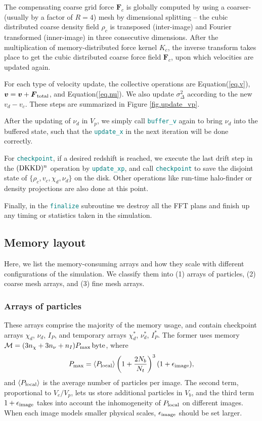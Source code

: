 \documentclass[10pt,twocolumn,reprint]{emulateapj}
\newcommand{\bs}{\boldsymbol}
\newcommand{\tcx}{\textcolor{teal}}
\begin{document}
The compensating coarse grid force ${\bs F}_c$ is globally computed by using a coarser- (usually by a factor of $R=4$) mesh by dimensional splitting -- the cubic distributed coarse density field $\rho_c$ is transposed (inter-image) and Fourier transformed (inner-image) in three consecutive dimensions. After the multiplication of memory-distributed force kernel $K_c$, the inverse transform takes place to get the cubic distributed coarse force field ${\bs F}_c$, upon which velocities are updated again.

For each type of velocity update, the collective operations are Equation(\ref{eq.v}), ${\bs v}={\bs v}+{\bs F}_{\rm total}$, and Equation(\ref{eq.nu}). We also update $\sigma^2_{\Delta}$ according to the new $v_d-v_c$. These steps are summarized in Figure \ref{fig.update_vp}.

After the updating of $\nu_d$ in $V_p$, we simply call {\tt \tcx{buffer\_v}} again to bring $\nu_d$ into the buffered state, such that the {\tt \tcx{update\_x}} in the next iteration will be done correctly.

For {\tt \tcx{checkpoint}},
if a desired redshift is reached, we execute the last drift step in the $({\rm DKKD})^n$ operation by {\tt \tcx{update\_xp}}, and call {\tt \tcx{checkpoint}} to save the disjoint state of $\{\rho_c,v_c,\chi_d,\nu_d\}$ on the disk. Other operations like run-time halo-finder or density projections are also done at this point.

Finally, in the {\tt \tcx{finalize}} subroutine
we destroy all the FFT plans and finish up any timing or statistics taken in the simulation.

\subsection{Memory layout}\label{ss.memory}
Here, we list the memory-consuming arrays and how they scale with different configurations of the simulation. We classify them into (1) arrays of particles, (2) coarse mesh arrays, and (3) fine mesh arrays.

\subsubsection{Arrays of particles}
These arrays comprise the majority of the memory usage, and contain checkpoint arrays $\chi_d$, $\nu_d$, $I_P$, and temporary arrays $\chi_d^*$, $\nu_d^*$, $I_P^*$. The former uses memory $\mathcal{M}=(3n_\chi+3n_\nu+n_I)P_{\rm max}\,{\rm byte}$, where
\begin{equation}\label{eq.npmax}
	P_{\rm max}=\left\langle P_{\rm local} \right\rangle \left( 1+\frac{2N_b}{N_t} \right)^3(1+\epsilon_{\rm image}),
\end{equation}
and $\left\langle P_{\rm local} \right\rangle$ is the average number of particles per image. The second term, proportional to $V_e/V_p$,  lets us store additional particles in $V_b$, and the third term $1+\epsilon_{\rm image}$ takes into account the inhomogeneity of $P_{\rm local}$ on different images. When each image models smaller physical scales, $\epsilon_{\rm image}$ should be set larger.
\end{document}
